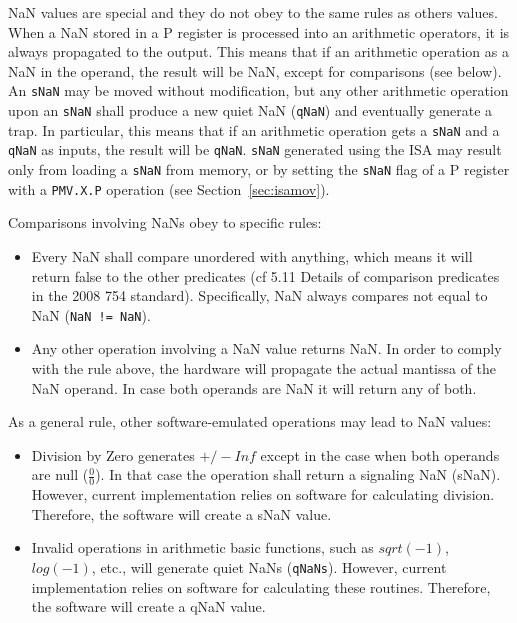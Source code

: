 NaN values are special and they do not obey to the same rules as others values.
When a NaN stored in a P register is processed into an arithmetic operators, it is always propagated to the output.
This means that if an arithmetic operation as a NaN in the operand, the result will be NaN, except for comparisons (see below).
An \texttt{sNaN} may be moved without modification, but any other arithmetic operation upon an \texttt{sNaN} shall produce a new quiet NaN (\texttt{qNaN}) and eventually generate a trap.
In particular, this means that if an arithmetic operation gets a \texttt{sNaN} and a \texttt{qNaN} as inputs, the result will be \texttt{qNaN}.
\texttt{sNaN}  generated using the ISA may result only from loading a \texttt{sNaN} from memory, or by setting the \texttt{sNaN} flag of a P register with a \texttt{PMV.X.P} operation (see Section~\ref{sec:isamov}).

Comparisons involving NaNs obey to specific rules:
\begin{itemize}[topsep=0pt]
    \item Every NaN shall compare unordered with anything, which means it will return false to the other predicates (cf 5.11 Details of comparison predicates in the 2008 754 standard).
        Specifically, NaN always compares not equal to NaN (\texttt{NaN != NaN}).
    \item Any other operation involving a NaN value returns NaN.
        In order to comply with the rule above, the hardware will propagate the actual mantissa of the NaN operand.
        In case both operands are NaN it will return any of both. 
\end{itemize}  

As a general rule, other software-emulated operations may lead to NaN values:
\begin{itemize}[topsep=0pt]
    \item Division by Zero generates $+/- Inf$ except in the case when both operands are null ($\frac{0}{0}$).
        In that case the operation shall return a signaling NaN (sNaN).
        However, current implementation relies on software for calculating division.
        Therefore, the software will create a sNaN value.
    \item Invalid operations in arithmetic basic functions, such as $sqrt(-1)$, $log(-1)$, etc., will generate quiet NaNs (\texttt{qNaNs}).
        However, current implementation relies on software for calculating these routines.
        Therefore, the software will create a qNaN value.
\end{itemize}

